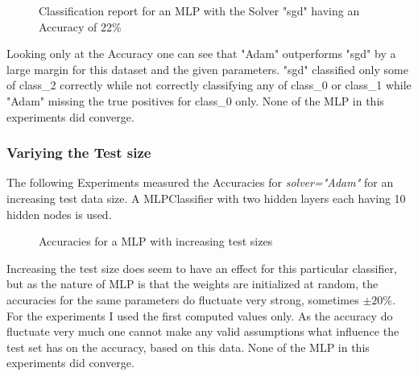 \documentclass[a4paper, 11pt]{article}
\begin{document}
\begin{figure}[H]
\centering
{}
\caption{Classification report for an MLP with the Solver "sgd" having an Accuracy of 22\%}
\end{figure}

Looking only at the Accuracy one can see that "Adam" outperforms "sgd" by a large margin for this dataset and the given parameters. "sgd" classified only some of class\_2 correctly while not correctly classifying any of class\_0 or class\_1 while "Adam" missing the true positives for class\_0 only.
None of the MLP in this experiments did converge.

\subsubsection{Variying the Test size}
The following Experiments measured the Accuracies for \textit{solver="Adam"} for an increasing test data size. A MLPClassifier with two hidden layers each having 10 hidden nodes is used.

\begin{figure}[H]
\centering
{}
\caption{Accuracies for a MLP with increasing test sizes}
\end{figure}

Increasing the test size does seem to have an effect for this particular classifier, but as the nature of MLP is that the weights are initialized at random, the accuracies for the same parameters do fluctuate very strong, sometimes $\pm 20\%$. For the experiments I used the first computed values only. As the accuracy do fluctuate very much one cannot make any valid assumptions what influence the test set has on the accuracy, based on this data.
None of the MLP in this experiments did converge.
\end{document}

